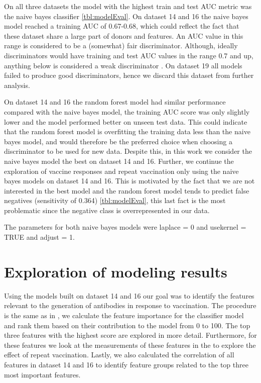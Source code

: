 On all three datasets the model with the highest train and test AUC metric was
the naive bayes classifier \autoref{tbl:modelEval}. On dataset 14 and 16 the
naive bayes model reached a training AUC of 0.67-0.68, which could reflect the fact
that these dataset share a large part of donors and features. An AUC value in
this range is considered to be a (somewhat) fair discriminator. Although,
ideally discriminators would have training and test AUC values in the range 0.7
and up, anything below is considered a weak discriminator
\citep{L_demann_2006}. On dataset 19 all models failed to produce good
discriminators, hence we discard this dataset from further analysis.

On dataset 14 and 16 the random forest model had similar performance compared
with the naive bayes model, the training AUC score was only slightly lower and
the model performed better on unseen test data. This could indicate that the
random forest model is overfitting the training data less than the naive bayes
model, and would therefore be the preferred choice when choosing a
discriminator to be used for new data. Despite this, in this work we consider
the naive bayes model the best on dataset 14 and 16.  Further, we continue the
exploration of vaccine responses and repeat vaccination only using the naive
bayes models on dataset 14 and 16. This is motivated by the fact that we are
not interested in the best model and the random forest model tends to predict
false negatives (sensitivity of 0.364) \autoref{tbl:modelEval}, this last fact
is the most problematic since the negative class is overrepresented in our data.

The parameters for both naive bayes models were laplace = 0 and usekernel =
TRUE and adjust = 1.

\section{Exploration of modeling results}

Using the models built on dataset 14 and 16 our goal was to identify the
features relevant to the generation of antibodies in response to vaccination.
The procedure is the same as in \spaper, we calculate the feature importance
for the classifier model and rank them based on their contribution to the model
from 0 to 100. The top three features with the highest score are explored in
more detail. Furthermore, for these features we look at the measurements of
these features in the \secondvis to explore the effect of repeat vaccination.
Lastly, we also calculated the correlation of all features in dataset 14 and 16
to identify feature groups related to the top three most important features.

